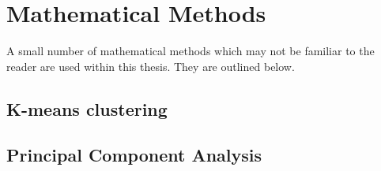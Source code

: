 \section{Mathematical Methods}

A small number of mathematical methods which may not be familiar to the reader are used within this thesis. They are outlined below.

\subsection{K-means clustering}
\subsection{Principal Component Analysis}